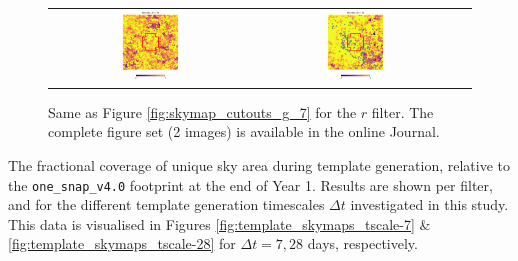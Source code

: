 \documentclass[preprintm,linenumbers]{aastex631}
\newcommand{\baseline}{\texttt{one\_snap\_v4.0}\xspace}
\begin{document}
\begin{figure}
\begin{tabular}{  c c c}
				\includegraphics[width=0.3\textwidth]{results/skymaps_cutout/skymaps_cutout_delta_first_year_one_snap_v4_0_10yrs_db_noDD_noTwi_tscale-7_nside-256_doAllTemplateMetrics_reduceCount_r_WFD_noDD_noTwi.pdf} &
				\includegraphics[width=0.3\textwidth]{results/skymaps_cutout/skymaps_cutout_delta_first_year_one_snap_v4_0_10yrs_db_noDD_noTwi_tscale-7_nside-256_doAllTemplateMetrics_reduceCount_r_GP_noDD_noTwi.pdf} \\
			\end{tabular}
			\caption{
				 Same as Figure \ref{fig:skymap_cutouts_g_7} for the $r$ filter.  
               The complete figure set (2 images) is available in the online Journal. 
			}
   \label{fig:skymap_cutouts_r_7}
		\end{figure}

		\begin{table}
			\centering
			
			\caption{
   The fractional coverage of unique sky area during template generation, relative to the \baseline footprint at the end of Year 1.
   Results are shown per filter, and for the different template generation timescales $\Delta t$ investigated in this study.
   This data is visualised in Figures \ref{fig:template_skymaps_tscale-7} \& \ref{fig:template_skymaps_tscale-28} for $\Delta t = 7, 28$ days, respectively.
			}
			\label{tab:year1_unique_coverage_templates}
		\end{table}
  
\end{document}
